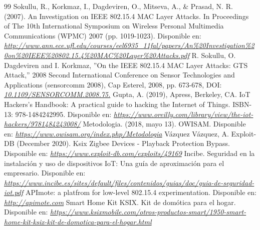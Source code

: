 \begin{thebibliography}{99}
 Sokullu, R., Korkmaz, I., Dagdeviren, O., Mitseva, A., \& Prasad, N. R. (2007). An Investigation on IEEE 802.15.4 MAC Layer Attacks. In Proceedings of The 10th International Symposium on Wireless Personal Multimedia Communications (WPMC) 2007 (pp. 1019-1023). Disponible en: {\it\url{ http://www.ann.ece.ufl.edu/courses/eel6935\_11fal/papers/An\%20Investigation\%20on\%20IEEE\%20802.15.4\%20MAC\%20Layer\%20Attacks.pdf}}
\clearpage
 R. Sokullu, O. Dagdeviren and I. Korkmaz, ''On the IEEE 802.15.4 MAC Layer Attacks: GTS Attack,'' 2008 Second International Conference on Sensor Technologies and Applications (sensorcomm 2008), Cap Esterel, 2008, pp. 673-678, DOI: {\it\href{ https://ieeexplore.ieee.org/document/4622738}{10.1109/SENSORCOMM.2008.75.}}
  Gupta, A. (2019), Apress, Berkeley, CA. IoT Hackers’s Handbook: A practical guide to hacking the Internet of Things. ISBN-13: 978-1484242995. Disponible en: {\it\url{ https://www.oreilly.com/library/view/the-iot-hackers/9781484243008/}}
 Metodologia. (2018, mayo 13). OWISAM. Disponible en: {\it\url{ https://www.owisam.org/index.php/Metodologia}}
 Vázquez Vázquez, A. Exploit-DB (December 2020). Ksix Zigbee Devices - Playback Protection Bypass. Disponible en: {\it\url{
https://www.exploit-db.com/exploits/49169}}
 Incibe. Seguridad en la instalación y uso de dispositivos IoT: Una guía de aproximación para el empresario. Disponible en: {\it\url{ https://www.incibe.es/sites/default/files/contenidos/guias/doc/guia-de-seguridad-iot.pdf}}
 APImote: a platfrom for low-level 802.15.4 experimentation. Disponible en: {\it\url{
http://apimote.com}}
 Smart Home Kit KSIX. Kit de domótica para el hogar. Disponible en: {\it\url{
https://www.ksixmobile.com/otros-productos-smart/1950-smart-home-kit-ksix-kit-de-domotica-para-el-hogar.html}}

\end{thebibliography}
